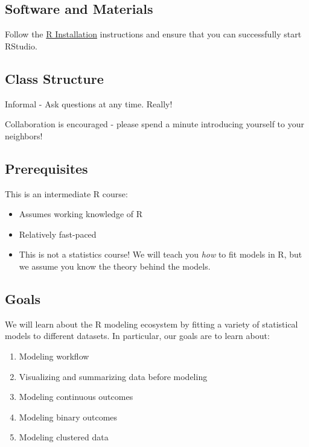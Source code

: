 \documentclass[]{book}
\providecommand{\tightlist}{%
  \setlength{\itemsep}{0pt}\setlength{\parskip}{0pt}}
\begin{document}
\hypertarget{software-and-materials-1}{%
\subsection{Software and Materials}\label{software-and-materials-1}}

Follow the \href{./Rinstall.html}{R Installation} instructions and ensure that you can successfully start RStudio.

\hypertarget{class-structure-1}{%
\subsection{Class Structure}\label{class-structure-1}}

Informal - Ask questions at any time. Really!

Collaboration is encouraged - please spend a minute introducing yourself to your neighbors!

\hypertarget{prerequisites-1}{%
\subsection{Prerequisites}\label{prerequisites-1}}

This is an intermediate R course:

\begin{itemize}
\tightlist
\item
  Assumes working knowledge of R
\item
  Relatively fast-paced
\item
  This is not a statistics course! We will teach you \emph{how} to fit models in R,
  but we assume you know the theory behind the models.
\end{itemize}

\hypertarget{goals-1}{%
\subsection{Goals}\label{goals-1}}

We will learn about the R modeling ecosystem by fitting a variety of statistical models to
different datasets. In particular, our goals are to learn about:

\begin{enumerate}
\def\labelenumi{\arabic{enumi}.}
\tightlist
\item
  Modeling workflow
\item
  Visualizing and summarizing data before modeling
\item
  Modeling continuous outcomes
\item
  Modeling binary outcomes
\item
  Modeling clustered data
\end{enumerate}
\end{document}
